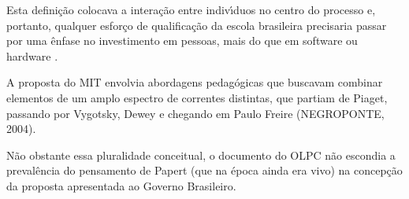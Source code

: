 \documentclass[
12pt,		%
openright,	%
twoside,  %
a4paper,			%
chapter=TITLE,		%
english,			%
french,				%
spanish,			%
brazil				%
]{USPSC-classe/USPSC}
\begin{document}
Esta defini\c{c}\~ao colocava a intera\c{c}\~ao entre indiv\'{\i}duos no centro do processo e, portanto, qualquer esfor\c{c}o de qualifica\c{c}\~ao da escola brasileira precisaria passar por uma \^enfase no investimento em \textquotedbl pessoas, mais do que em software ou hardware \textquotedbl .

















A proposta do MIT envolvia abordagens pedag\'ogicas que buscavam combinar elementos de um amplo espectro de correntes distintas, que partiam de Piaget, passando por Vygotsky, Dewey e chegando em Paulo Freire  (NEGROPONTE, 2004).

















N\~ao obstante essa pluralidade conceitual, o documento do OLPC n\~ao escondia a preval\^encia do pensamento de Papert (que na \'epoca ainda era vivo) na concep\c{c}\~ao da proposta apresentada ao Governo Brasileiro.


















\noindent\begin{center}\mbox{\centering{}}\end{center}
\end{document}
